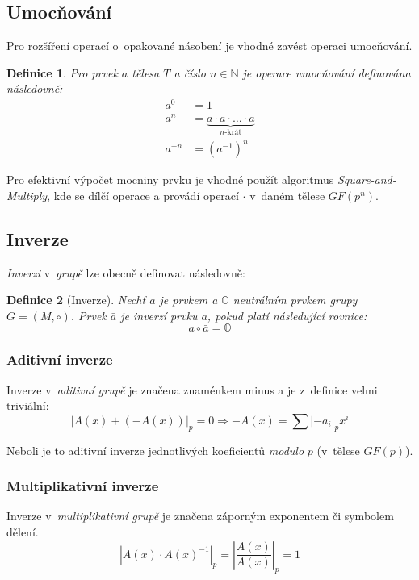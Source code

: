 \documentclass[thesis=M,czech,hidelinks]{FITthesis}[2012/06/26]
\newcommand{\0}{{\textcolor[gray]{0.80}{0}}}
\newtheorem{definice}{Definice}
\begin{document}
\subsection{Umocňování}
Pro rozšíření operací o~opakované násobení je vhodné zavést operaci umocňování.

\begin{definice}
    Pro prvek $a$ tělesa $T$ a číslo $n\in\mathbb{N}$ je operace
    umocňování definována následovně:
    \begin{align*}
        a^0     &= 1 \\
        a^n     &= \underbrace{a \cdot a \cdot \ldots \cdot a}_{\text{$n$-krát}}\\
        a^{-n}  &= \left(a^{-1}\right)^n
    \end{align*}
\end{definice}

Pro efektivní výpočet mocniny prvku je vhodné použít algoritmus
\emph{Square-and-Multiply}, kde se dílčí operace  a 
provádí operací $\cdot$ v~daném tělese $GF(p^n)$.

\subsection{Inverze}
\emph{Inverzi} v~\emph{grupě} lze obecně definovat následovně:
\begin{definice}[Inverze]
    Nechť $a$ je prvkem a $\mathbb{O}$ neutrálním prvkem \emph{grupy} \\
    $G = (M,\circ)$. Prvek $\bar{a}$ je \emph{inverzí} prvku $a$, pokud
    platí následující rovnice:
    $$ a \circ \bar{a} = \mathbb{O} $$
\end{definice}

\subsubsection{Aditivní inverze}
Inverze v~\emph{aditivní grupě} je značena znaménkem minus \uv{$-$} a je
z~definice velmi triviální:
$$ \left| A(x) + (-A(x)) \right|_p = 0 \Rightarrow
-A(x) = \sum \left|-a_i\right|_p x^i $$

Neboli je to aditivní inverze jednotlivých koeficientů \emph{modulo} $p$
(v~tělese $GF(p)$).


\subsubsection{Multiplikativní inverze}
Inverze v~\emph{multiplikativní grupě} je značena záporným exponentem
 či symbolem dělení.
$$ \left| A(x) \cdot A(x)^{-1} \right|_p =
\left| \frac{A(x)}{A(x)} \right|_p = 1 $$
\end{document}
